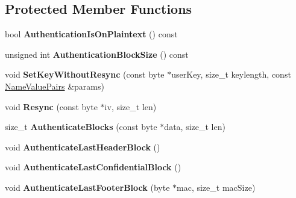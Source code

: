 \subsection*{Protected Member Functions}
\begin{DoxyCompactItemize}
\item 
\hypertarget{class_c_c_m___base_ae71222310ab7095c85d95cc12f8bb704}{
bool {\bfseries AuthenticationIsOnPlaintext} () const }
\label{class_c_c_m___base_ae71222310ab7095c85d95cc12f8bb704}

\item 
\hypertarget{class_c_c_m___base_a30c8074bd563f0a1ef80042c993f70d2}{
unsigned int {\bfseries AuthenticationBlockSize} () const }
\label{class_c_c_m___base_a30c8074bd563f0a1ef80042c993f70d2}

\item 
\hypertarget{class_c_c_m___base_ad92d29b79919076c85879f5e0abf13cf}{
void {\bfseries SetKeyWithoutResync} (const byte $\ast$userKey, size\_\-t keylength, const \hyperlink{class_name_value_pairs}{NameValuePairs} \&params)}
\label{class_c_c_m___base_ad92d29b79919076c85879f5e0abf13cf}

\item 
\hypertarget{class_c_c_m___base_a08d91609775997ffc09579dc98b6b5aa}{
void {\bfseries Resync} (const byte $\ast$iv, size\_\-t len)}
\label{class_c_c_m___base_a08d91609775997ffc09579dc98b6b5aa}

\item 
\hypertarget{class_c_c_m___base_a003237621d833139a4102300d067120d}{
size\_\-t {\bfseries AuthenticateBlocks} (const byte $\ast$data, size\_\-t len)}
\label{class_c_c_m___base_a003237621d833139a4102300d067120d}

\item 
\hypertarget{class_c_c_m___base_a78ff7cbcb2a55e342df8f3ef3850c838}{
void {\bfseries AuthenticateLastHeaderBlock} ()}
\label{class_c_c_m___base_a78ff7cbcb2a55e342df8f3ef3850c838}

\item 
\hypertarget{class_c_c_m___base_ae8c2923e95c8bd4bdbbff06662bcf437}{
void {\bfseries AuthenticateLastConfidentialBlock} ()}
\label{class_c_c_m___base_ae8c2923e95c8bd4bdbbff06662bcf437}

\item 
\hypertarget{class_c_c_m___base_a86ba222168efd560400f84b5806db276}{
void {\bfseries AuthenticateLastFooterBlock} (byte $\ast$mac, size\_\-t macSize)}
\label{class_c_c_m___base_a86ba222168efd560400f84b5806db276}


\end{DoxyCompactItemize}
